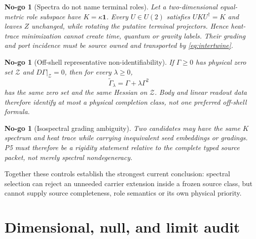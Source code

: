 \documentclass[11pt,a4paper]{article}
\newtheorem{nogo}[definition]{No-go}
\theoremstyle{remark}
\newcommand{\id}{\mathbf 1}
\begin{document}
\begin{nogo}[Spectra do not name terminal roles]
Let a two-dimensional equal-metric role subspace have $K=\kappa\id$.  Every
$U\in U(2)$ satisfies $UKU^\dagger=K$ and leaves $Z$ unchanged, while rotating
the putative terminal projectors.  Hence heat-trace minimization cannot create
time, quantum or gravity labels.  Their grading and port incidence must be
source owned and transported by \eqref{eq:intertwine}.
\end{nogo}

\begin{nogo}[Off-shell representative non-identifiability]
If $\Gamma\ge0$ has physical zero set $\mathcal Z$ and
$D\Gamma\vert_{\mathcal Z}=0$, then for every $\lambda\ge0$,
\begin{equation}
 \widetilde\Gamma_\lambda=\Gamma+\lambda\Gamma^2
 \label{eq:offshell}
\end{equation}
has the same zero set and the same Hessian on $\mathcal Z$.  Body and linear
readout data therefore identify at most a physical completion class, not one
preferred off-shell formula.
\end{nogo}

\begin{nogo}[Isospectral grading ambiguity]
Two candidates may have the same $K$ spectrum and heat trace while carrying
inequivalent seed embeddings or gradings.  P5 must therefore be a rigidity
statement relative to the complete typed source packet, not merely spectral
nondegeneracy.
\end{nogo}

Together these controls establish the strongest current conclusion:
spectral selection can reject an unneeded carrier extension inside a frozen
source class, but cannot supply source completeness, role semantics or its own
physical priority.

\section{Dimensional, null, and limit audit}
\end{document}

